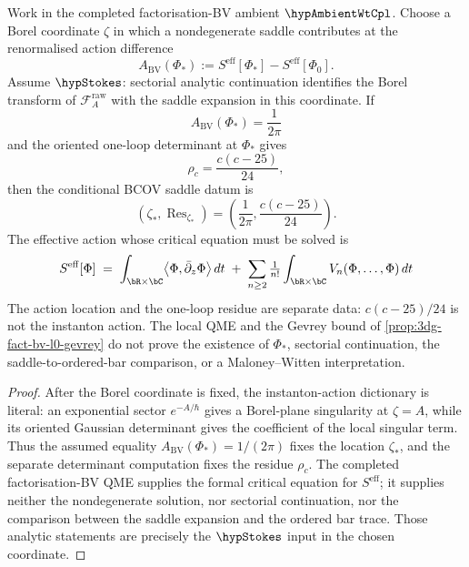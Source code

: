 \begin{proposition}[Factorisation-BV BCOV saddle datum at
$\zeta_{\ast}=1/(2\pi)$; \ClaimStatusConditional; licensing
$\alpha+\gamma+\delta$ via Borel-coordinate normalisation,
$\hypAmbientWtCpl+\hypStokes$]
\label{prop:3dg-fact-bv-bcov-instanton}%
%
%
Work in the completed factorisation-BV ambient \(\hypAmbientWtCpl\).
Choose a Borel coordinate \(\zeta\) in which a nondegenerate saddle
contributes at the renormalised action difference
\[
 A_{\mathrm{BV}}(\Phi_\ast)
 :=
 S^{\mathrm{eff}}[\Phi_\ast]-S^{\mathrm{eff}}[\Phi_0].
\]
Assume \(\hypStokes\): sectorial analytic continuation identifies the
Borel transform of \(\mathcal F_A^{\mathrm{raw}}\) with the saddle
expansion in this coordinate. If
\[
 A_{\mathrm{BV}}(\Phi_\ast)=\frac{1}{2\pi}
\]
and the oriented one-loop determinant at \(\Phi_\ast\) gives
\[
 \rho_c=\frac{c(c-25)}{24},
\]
then the conditional BCOV saddle datum is
\[
 (\zeta_\ast,\operatorname{Res}_{\zeta_\ast})
 =
 \left(\frac{1}{2\pi},\frac{c(c-25)}{24}\right).
\]
The effective action whose critical equation must be solved is
\[
 S^{\mathrm{eff}}[\Phi]
 \;=\;
 \int_{\bR\times\bC}
 \bigl\langle\Phi, \bar\partial_{z}\Phi\bigr\rangle\, dt
 \;+\;
 \sum_{n\ge 2} \tfrac{1}{n!}
 \int_{\bR\times\bC} V_{n}(\Phi,\ldots,\Phi)\, dt
\]
The action location and the one-loop residue are separate data:
\(c(c-25)/24\) is not the instanton action. The local QME and the
Gevrey bound of \autoref{prop:3dg-fact-bv-l0-gevrey} do not prove the
existence of \(\Phi_\ast\), sectorial continuation, the
saddle-to-ordered-bar comparison, or a Maloney--Witten interpretation.
\end{proposition}

\begin{proof}
After the Borel coordinate is fixed, the instanton-action dictionary is
literal: an exponential sector \(e^{-A/\hbar}\) gives a Borel-plane
singularity at \(\zeta=A\), while its oriented Gaussian determinant gives
the coefficient of the local singular term. Thus the assumed equality
\(A_{\mathrm{BV}}(\Phi_\ast)=1/(2\pi)\) fixes the location
\(\zeta_\ast\), and the separate determinant computation fixes the
residue \(\rho_c\). The completed factorisation-BV QME supplies the
formal critical equation for \(S^{\mathrm{eff}}\); it supplies neither
the nondegenerate solution, nor sectorial continuation, nor the
comparison between the saddle expansion and the ordered bar trace.
Those analytic statements are precisely the \(\hypStokes\) input in the
chosen coordinate.
\end{proof}

